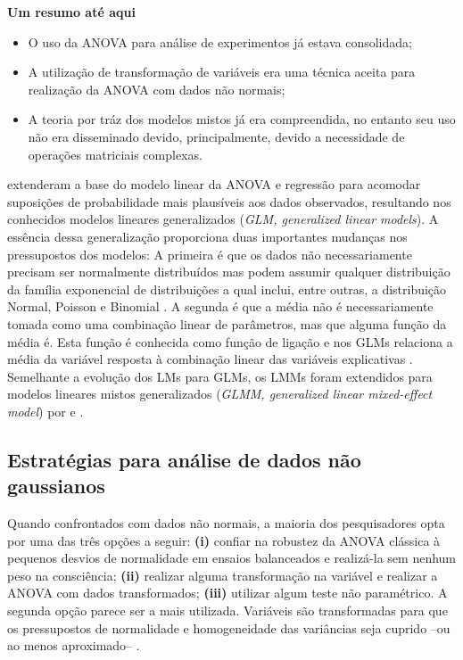 \documentclass[
]{book}
\providecommand{\tightlist}{%
  \setlength{\itemsep}{0pt}\setlength{\parskip}{0pt}}
\begin{document}
\begin{note}
\textbf{Um resumo até aqui}

\begin{itemize}
\tightlist
\item
  O uso da ANOVA para análise de experimentos já estava consolidada;
\item
  A utilização de transformação de variáveis era uma técnica aceita para realização da ANOVA com dados não normais;
\item
  A teoria por tráz dos modelos mistos já era compreendida, no entanto seu uso não era disseminado devido, principalmente, devido a necessidade de operações matriciais complexas.
\end{itemize}
\end{note}

\citet{Nelder1972} extenderam a base do modelo linear da ANOVA e regressão para acomodar suposições de probabilidade mais plausíveis aos dados observados, resultando nos conhecidos modelos lineares generalizados (\emph{GLM, generalized linear models}). A essência dessa generalização proporciona duas importantes mudanças nos pressupostos dos modelos: A primeira é que os dados não necessariamente precisam ser normalmente distribuídos mas podem assumir qualquer distribuição da família exponencial de distribuições a qual inclui, entre outras, a distribuição Normal, Poisson e Binomial \citep{Koopman1936}. A segunda é que a média não é necessariamente tomada como uma combinação linear de parâmetros, mas que alguma função da média é. Esta função é conhecida como função de ligação e nos GLMs relaciona a média da variável resposta à combinação linear das variáveis explicativas \citep{Nelder1972}. Semelhante a evolução dos LMs para GLMs, os LMMs foram extendidos para modelos lineares mistos generalizados (\emph{GLMM, generalized linear mixed-effect model}) por \citet{Wolfinger1993} e \citet{Breslow1993}.

\hypertarget{estratuxe9gias-para-anuxe1lise-de-dados-nuxe3o-gaussianos}{%
\subsection{Estratégias para análise de dados não gaussianos}\label{estratuxe9gias-para-anuxe1lise-de-dados-nuxe3o-gaussianos}}

Quando confrontados com dados não normais, a maioria dos pesquisadores opta por uma das três opções a seguir: \textbf{(i)} confiar na robustez da ANOVA clássica à pequenos desvios de normalidade em ensaios balanceados \citep{Blanca2017} e realizá-la sem nenhum peso na consciência; \textbf{(ii)} realizar alguma transformação na variável e realizar a ANOVA com dados transformados; \textbf{(iii)} utilizar algum teste não paramétrico. A segunda opção parece ser a mais utilizada. Variáveis são transformadas para que os pressupostos de normalidade e homogeneidade das variâncias seja cuprido --ou ao menos aproximado-- \citep{Bartlett1947}.
\end{document}
